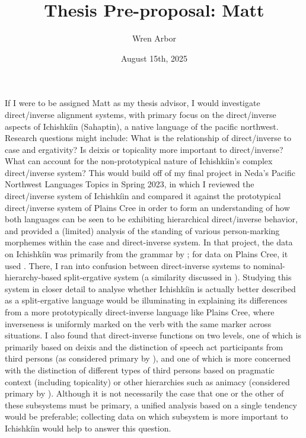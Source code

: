 \documentclass[11pt]{article}
\title{Thesis Pre-proposal: Matt}
\author{Wren Arbor}
\date{August 15th, 2025}
\begin{document}
\maketitle

If I were to be assigned Matt as my thesis advisor, I would investigate direct/inverse alignment systems, with primary focus on the direct/inverse aspects of Ichishkíin (Sahaptin), a native language of the pacific northwest. Research questions might include:  What is the relationship of direct/inverse to case and ergativity? Is deixis or topicality more important to direct/inverse? What can account for the non-prototypical nature of Ichishkíin's complex direct/inverse system? This would build off of my final project in Neda's Pacific Northwest Languages Topics in Spring 2023, in which I reviewed the direct/inverse system of Ichishkíin and compared it against the prototypical direct/inverse system of Plains Cree in order to form an understanding of how both languages can be seen to be exhibiting hierarchical direct/inverse behavior, and provided a (limited) analysis of the standing of various person-marking morphemes within the case and direct-inverse system. In that project, the data on Ichishkíin was primarily from the grammar by \textcite{jansen2010}; for data on Plains Cree, it used \textcite{dahlstrom1986}. There, I ran into confusion between direct-inverse systems to nominal-hierarchy-based split-ergative system (a similarity discussed in \cite{delancey_interpretation_1981}). Studying this system in closer detail to analyse whether Ichishkíin is actually better described as a split-ergative language would be illuminating in explaining its differences from a more prototypically direct-inverse language like Plains Cree, where inverseness is uniformly marked on the verb with the same marker across situations. I also found that direct-inverse functions on two levels, one of which is primarily based on deixis and the distinction of speech act participants from third persons (as considered primary by \cite{zúñiga2006}), and one of which is more concerned with the distinction of different types of third persons based on pragmatic context (including topicality) or other hierarchies such as animacy (considered primary by \cite{givón1994}). Although it is not necessarily the case that one or the other of these subsystems must be primary, a unified analysis based on a single tendency would be preferable; collecting data on which subsystem is more important to Ichishkíin would help to answer this question.
\end{document}
